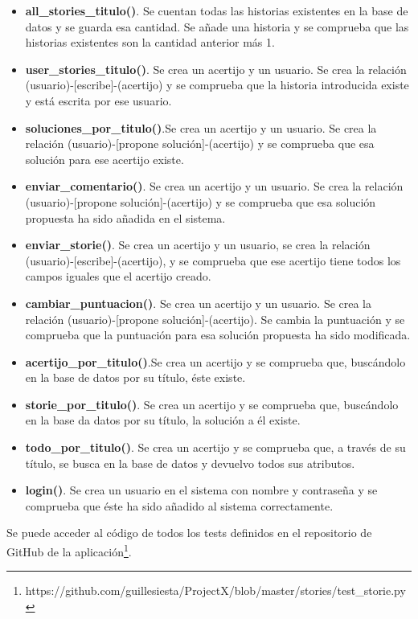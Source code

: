 \begin{itemize}
    \item \textbf{all\_stories\_titulo()}. Se cuentan todas las historias existentes en la base de datos y se guarda esa cantidad. Se añade una historia y se comprueba que las historias existentes son la cantidad anterior más 1.
     \item \textbf{user\_stories\_titulo()}. Se crea un acertijo y un usuario. Se crea la relación (usuario)-[escribe]-(acertijo) y se comprueba que la historia introducida existe y está escrita por ese usuario.
     \item \textbf{soluciones\_por\_titulo()}.Se crea un acertijo y un usuario. Se crea la relación (usuario)-[propone solución]-(acertijo) y se comprueba que esa solución para ese acertijo existe.
     \item \textbf{enviar\_comentario()}. Se crea un acertijo y un usuario. Se crea la relación (usuario)-[propone solución]-(acertijo) y se comprueba que esa solución propuesta ha sido añadida en el sistema.
     \item \textbf{enviar\_storie()}. Se crea un acertijo y un usuario, se crea la relación (usuario)-[escribe]-(acertijo), y se comprueba que ese acertijo tiene todos los campos iguales que el acertijo creado.
     \item \textbf{cambiar\_puntuacion()}. Se crea un acertijo y un usuario. Se crea la relación (usuario)-[propone solución]-(acertijo). Se cambia la puntuación y se comprueba que la puntuación para esa solución propuesta ha sido modificada.
     \item \textbf{acertijo\_por\_titulo()}.Se crea un acertijo y se comprueba que, buscándolo en la base de datos por su título, éste existe.
     \item \textbf{storie\_por\_titulo()}. Se crea un acertijo y se comprueba que, buscándolo en la base da datos por su título, la solución a él existe.
     \item \textbf{todo\_por\_titulo()}. Se crea un acertijo y se comprueba que, a través de su título, se busca en la base de datos y devuelvo todos sus atributos.
     \item \textbf{login()}. Se crea un usuario en el sistema con nombre y contraseña y se comprueba que éste ha sido añadido al sistema correctamente.
\end{itemize}

Se puede acceder al código de todos los tests definidos en el repositorio de GitHub de la aplicación\footnote{https://github.com/guillesiesta/ProjectX/blob/master/stories/test\_storie.py}. 


